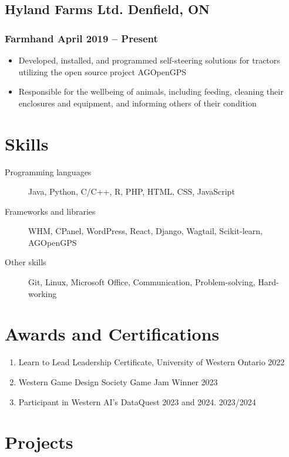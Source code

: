 \documentclass[11pt]{article}
\newcommand{\rside}[1]{
  \hfill {\normalfont\color{accent} #1}%
}
\begin{document}
\subsection{Hyland Farms Ltd. \rside{Denfield, ON}}
\subsubsection{Farmhand \rside{April 2019 -- Present}}
\begin{itemize}
  \item Developed, installed, and programmed self-steering solutions for tractors utilizing the open source project AGOpenGPS
  \item Responsible for the wellbeing of animals, including feeding, cleaning their enclosures and equipment, and informing others of their condition
\end{itemize}


\section{Skills}
\begin{description}
  \item[Programming languages] Java, Python, C/C++, R, PHP, HTML, CSS, JavaScript
  \item[Frameworks and libraries] WHM, CPanel, WordPress, React, Django, Wagtail, Scikit-learn, AGOpenGPS
  \item[Other skills] Git, Linux, Microsoft Office, Communication, Problem-solving, Hard-working 
\end{description}


\section{Awards and Certifications}
\begin{enumerate}[label=\null, left=0pt..0pt, itemsep=0pt]
  \item Learn to Lead Leadership Certificate, University of Western Ontario \rside{2022}
  \item Western Game Design Society Game Jam Winner\rside{2023}
  \item Participant in Western AI's DataQuest 2023 and 2024. \rside{2023/2024}
\end{enumerate}


\section{Projects}
\end{document}
